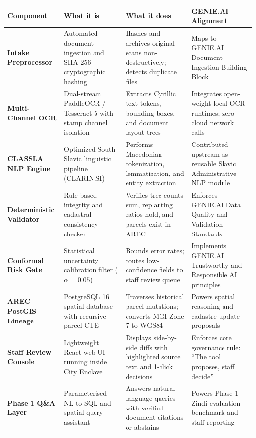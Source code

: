 \documentclass[9pt,a4paper]{article}
\begin{document}
\begin{tabularx}{\textwidth}{@{}l p{4.0cm} X X@{}}
\toprule
\textsf{\textbf{\fontsize{8pt}{10pt}\selectfont Component}} & \textsf{\textbf{\fontsize{8pt}{10pt}\selectfont What it is}} & \textsf{\textbf{\fontsize{8pt}{10pt}\selectfont What it does}} & \textsf{\textbf{\fontsize{8pt}{10pt}\selectfont GENIE.AI Alignment}} \\
\midrule
\textbf{Intake Preprocessor} & Automated document ingestion and SHA-256 cryptographic hashing & Hashes and archives original scans non-destructively; detects duplicate files & Maps to GENIE.AI Document Ingestion Building Block \\
\textbf{Multi-Channel OCR} & Dual-stream PaddleOCR / Tesseract 5 with stamp channel isolation & Extracts Cyrillic text tokens, bounding boxes, and document layout trees & Integrates open-weight local OCR runtimes; zero cloud network calls \\
\textbf{CLASSLA NLP Engine} & Optimized South Slavic linguistic pipeline (CLARIN.SI) & Performs Macedonian tokenization, lemmatization, and entity extraction & Contributed upstream as reusable Slavic Administrative NLP module \\
\textbf{Deterministic Validator} & Rule-based integrity and cadastral consistency checker & Verifies tree counts sum, replanting ratios hold, and parcels exist in AREC & Enforces GENIE.AI Data Quality and Validation Standards \\
\textbf{Conformal Risk Gate} & Statistical uncertainty calibration filter ($\alpha = 0.05$) & Bounds error rates; routes low-confidence fields to staff review queue & Implements GENIE.AI Trustworthy and Responsible AI principles \\
\textbf{AREC PostGIS Lineage} & PostgreSQL 16 spatial database with recursive parcel CTE & Traverses historical parcel mutations; converts MGI Zone 7 to WGS84 & Powers spatial reasoning and cadastre update proposals \\
\textbf{Staff Review Console} & Lightweight React web UI running inside City Enclave & Displays side-by-side diffs with highlighted source text and 1-click decisions & Enforces core governance rule: ``The tool proposes, staff decide'' \\
\textbf{Phase 1 Q\&A Layer} & Parameterised NL-to-SQL and spatial query assistant & Answers natural-language queries with verified document citations or abstains & Powers Phase 1 Zindi evaluation benchmark and staff reporting \\
\bottomrule
\end{tabularx}
\end{document}
